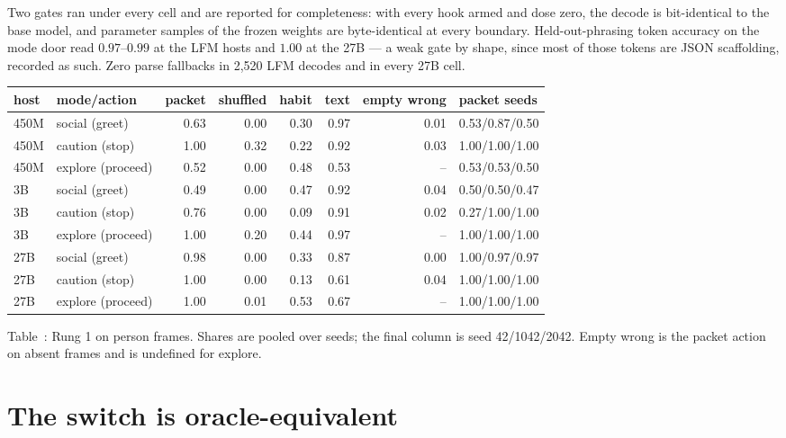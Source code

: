 \documentclass[11pt]{article}
\begin{document}
Two gates ran under every cell and are reported for completeness: with
every hook armed and dose zero, the decode is bit-identical to the base
model, and parameter samples of the frozen weights are byte-identical at
every boundary. Held-out-phrasing token accuracy on the mode door read
$0.97$--$0.99$ at the LFM hosts and $1.00$ at the 27B --- a weak gate by
shape, since most of those tokens are JSON scaffolding, recorded as
such. Zero parse fallbacks in 2,520 LFM decodes and in every 27B cell.

\par\medskip

\begin{center}
{\scriptsize
\setlength{\tabcolsep}{3pt}%
\begin{tabular}{llrrrrrl}
\toprule
host & mode/action & packet & shuffled & habit & text & empty wrong & packet seeds \\
\midrule
450M & social (greet) & 0.63 & 0.00 & 0.30 & 0.97 & 0.01 & 0.53/0.87/0.50 \\
450M & caution (stop) & 1.00 & 0.32 & 0.22 & 0.92 & 0.03 & 1.00/1.00/1.00 \\
450M & explore (proceed) & 0.52 & 0.00 & 0.48 & 0.53 & -- & 0.53/0.53/0.50 \\
3B & social (greet) & 0.49 & 0.00 & 0.47 & 0.92 & 0.04 & 0.50/0.50/0.47 \\
3B & caution (stop) & 0.76 & 0.00 & 0.09 & 0.91 & 0.02 & 0.27/1.00/1.00 \\
3B & explore (proceed) & 1.00 & 0.20 & 0.44 & 0.97 & -- & 1.00/1.00/1.00 \\
27B & social (greet) & 0.98 & 0.00 & 0.33 & 0.87 & 0.00 & 1.00/0.97/0.97 \\
27B & caution (stop) & 1.00 & 0.00 & 0.13 & 0.61 & 0.04 & 1.00/1.00/1.00 \\
27B & explore (proceed) & 1.00 & 0.01 & 0.53 & 0.67 & -- & 1.00/1.00/1.00 \\
\bottomrule
\end{tabular}
}
\end{center}
\noindent Table~\thetable: Rung 1 on person frames. Shares are pooled over seeds; the final column is seed 42/1042/2042. Empty wrong is the packet action on absent frames and is undefined for explore.
\label{tab:r1}
\par

\clearpage

\section{The switch is oracle-equivalent}\label{sec:switch}
\end{document}
